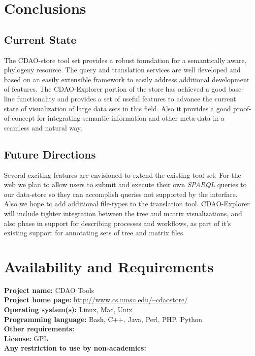 \documentclass[10pt]{bmc_article}
\newenvironment{bmcformat}{\begin{raggedright}\baselineskip20pt\sloppy\setboolean{publ}{false}}{\end{raggedright}\baselineskip20pt\sloppy}
\begin{document}
\begin{bmcformat}

\section*{Conclusions}
   \subsection*{Current State}
     The CDAO-store tool set provides a robust foundation for a semantically aware, phylogeny resource. The query and translation
     services are well developed and based on an easily extensible framework to easily address additional development of features.
     The CDAO-Explorer portion of the store has achieved a good base-line functionality and provides a set of useful features
     to advance the current state of visualization of large data sets in this field. Also it provides a good proof-of-concept for
     integrating semantic information and other meta-data in a seamless and natural way. 

   \subsection*{Future Directions}
     Several exciting features are envisioned to extend the existing tool set. For the web we plan to allow users to submit and execute
     their own \textit{SPARQL} queries to our data-store so they can accomplish queries not supported by the interface. Also we hope to
     add additional file-types to the translation tool. CDAO-Explorer will include tighter integration between the tree and matrix 
     visualizations, and also phase in support for describing processes and workflows, as part of it's existing support for annotating
     sets of tree and matrix files.


  
\section*{Availability and Requirements}
  \textbf{Project name:} CDAO Tools\\
  \textbf{Project home page:} \url{http://www.cs.nmsu.edu/~cdaostore/} \\ 
  \textbf{Operating system(s):} Linux, Mac, Unix \\
  \textbf{Programming language:} Bash, C++, Java, Perl, PHP, Python \\ 
  \textbf{Other requirements:} \\ 
  \textbf{License:} GPL \\ 
  \textbf{Any restriction to use by non-academics:} \\ 


\end{bmcformat}
\end{document}

